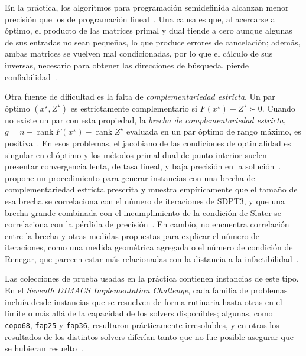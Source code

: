 En la práctica, los algoritmos para programación semidefinida alcanzan menor precisión que los
de programación lineal~\parencite[p.~105]{weiNumericalStabilityLinear}. Una causa es que, al
acercarse al óptimo, el producto de las matrices primal y dual tiende a cero aunque algunas de
sus entradas no sean pequeñas, lo que produce errores de cancelación; además, ambas matrices se
vuelven mal condicionadas, por lo que el cálculo de sus inversas, necesario para obtener las
direcciones de búsqueda, pierde confiabilidad~\parencite[pp.~105--106]{weiNumericalStabilityLinear}.

Otra fuente de dificultad es la falta de \textit{complementariedad estricta}. Un par óptimo
$(x^\star, Z^\star)$ es estrictamente complementario si $F(x^\star) + Z^\star \succ 0$. Cuando no
existe un par con esta propiedad, la \textit{brecha de complementariedad estricta},
$g = n - \operatorname{rank} F(x^\star) - \operatorname{rank} Z^\star$ evaluada en un par óptimo
de rango máximo, es positiva~\parencite[p.~109]{weiNumericalStabilityLinear}. En esos problemas,
el jacobiano de las condiciones de optimalidad es singular en el óptimo y los métodos primal-dual
de punto interior suelen presentar convergencia lenta, de tasa lineal, y baja precisión en la
solución~\parencite[p.~108]{weiNumericalStabilityLinear}. \textcite{weiNumericalStabilityLinear}
propone un procedimiento para generar instancias con una brecha de complementariedad estricta
prescrita y muestra empíricamente que el tamaño de esa brecha se correlaciona con el número de
iteraciones de SDPT3, y que una brecha grande combinada con el incumplimiento de la condición de
Slater se correlaciona con la pérdida de precisión~\parencite[p.~108]{weiNumericalStabilityLinear}.
En cambio, no encuentra correlación entre la brecha y otras medidas propuestas para explicar el
número de iteraciones, como una medida geométrica agregada o el número de condición de Renegar,
que parecen estar más relacionadas con la distancia a la
infactibilidad~\parencite[pp.~107--108 y 127]{weiNumericalStabilityLinear}.

Las colecciones de prueba usadas en la práctica contienen instancias de este tipo. En el
\textit{Seventh DIMACS Implementation Challenge}, cada familia de problemas incluía desde
instancias que se resuelven de forma rutinaria hasta otras en el límite o más allá de la
capacidad de los solvers disponibles; algunas, como \texttt{copo68}, \texttt{fap25} y
\texttt{fap36}, resultaron prácticamente irresolubles, y en otras los resultados de los distintos
solvers diferían tanto que no fue posible asegurar que se hubieran
resuelto~\parencite[p.~419]{mittelmannIndependentBenchmarkingSDP2003a}.

